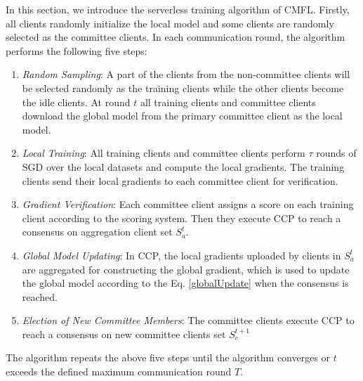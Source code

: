 \documentclass[10pt,journal,compsoc]{IEEEtran}
\begin{document}
In this section, we introduce the serverless training algorithm of CMFL. Firstly, all clients randomly initialize the local model and some clients are randomly selected as the committee clients. In each communication round, the algorithm performs the following five steps:
\begin{enumerate}
  \item \textit{Random Sampling}: A part of the clients from the non-committee clients will be selected randomly as the training clients while the other clients become the idle clients. At round $t$ all training clients and committee clients download the global model from the primary committee client as the local model.
  \item \textit{Local Training}: All training clients and committee clients perform $\tau$ rounds of SGD over the local datasets and compute the local gradients. The training clients send their local gradients to each committee client for verification. 
  \item \textit{Gradient Verification}: Each committee client assigns a score on each training client according to the scoring system. Then they execute CCP to reach a consensus on aggregation client set $S_a^t$. 
  \item \textit{Global Model Updating}: In CCP, the local gradients uploaded by clients in $S_a^t$ are aggregated for constructing the global gradient, which is used to update the global model according to the Eq. \eqref{globalUpdate} when the consensus is reached.

  \item \textit{Election of New Committee Members}: The committee clients execute CCP to reach a consensus on new committee clients set $S_c^{t+1}$ 
\end{enumerate}

The algorithm repeats the above five steps until the algorithm converges or $t$ exceeds the defined maximum communication round $T$.
\end{document}
